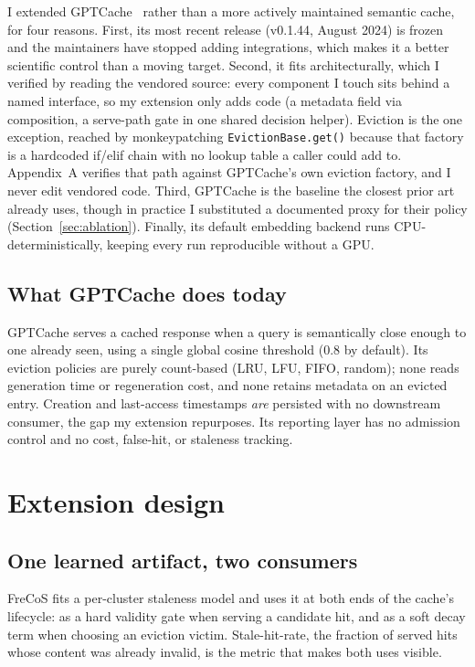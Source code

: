 \documentclass[10pt]{article}
\begin{document}
I extended GPTCache~\cite{gptcache} rather than a more actively maintained semantic cache,
for four reasons. First, its most recent release (v0.1.44, August 2024) is frozen and the
maintainers
have stopped adding integrations, which makes it a better scientific control than a moving
target. Second, it fits architecturally, which I verified by reading the vendored source: every
component I touch sits behind a named interface, so my extension only adds code (a metadata
field via composition, a serve-path gate in one shared decision helper). Eviction is the one
exception, reached by monkeypatching \texttt{EvictionBase.get()} because that factory is a
hardcoded if/elif chain with no lookup table a caller could add to. Appendix~A verifies that
path against GPTCache's own eviction factory, and I never edit vendored code. Third, GPTCache
is the baseline the closest prior art already uses, though in practice I substituted a
documented proxy for their policy (Section~\ref{sec:ablation}). Finally, its default embedding
backend runs CPU-deterministically, keeping every run reproducible without a GPU.

\subsection{What GPTCache does today}

GPTCache serves a cached response when a query is semantically close enough to one already
seen, using a single global cosine threshold (0.8 by default). Its eviction policies are
purely count-based (LRU, LFU, FIFO, random); none reads generation time or regeneration
cost, and none retains metadata on an evicted entry. Creation and last-access timestamps
\emph{are} persisted with no downstream consumer, the gap my extension repurposes. Its
reporting layer has no admission control and no cost, false-hit, or staleness tracking.

\section{Extension design}

\subsection{One learned artifact, two consumers}

FreCoS fits a per-cluster staleness model and uses it at both ends of the cache's
lifecycle: as a hard validity gate when serving a candidate hit, and as a soft decay term
when choosing an eviction victim. Stale-hit-rate, the fraction of served hits whose content
was already invalid, is the metric that makes both uses visible.
\end{document}
